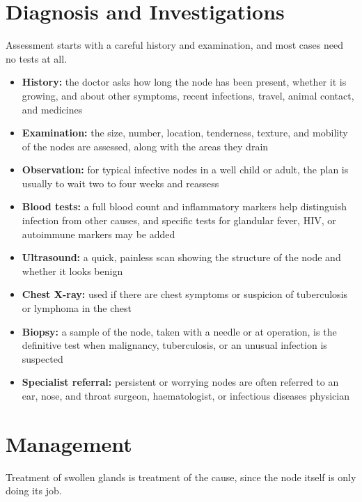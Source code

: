 \section*{Diagnosis and Investigations}
Assessment starts with a careful history and examination, and most cases need no tests at all.

\begin{itemize}
    \item \textbf{History:} the doctor asks how long the node has been present, whether it is growing, and about other symptoms, recent infections, travel, animal contact, and medicines
    \item \textbf{Examination:} the size, number, location, tenderness, texture, and mobility of the nodes are assessed, along with the areas they drain
    \item \textbf{Observation:} for typical infective nodes in a well child or adult, the plan is usually to wait two to four weeks and reassess
    \item \textbf{Blood tests:} a full blood count and inflammatory markers help distinguish infection from other causes, and specific tests for glandular fever, HIV, or autoimmune markers may be added
    \item \textbf{Ultrasound:} a quick, painless scan showing the structure of the node and whether it looks benign
    \item \textbf{Chest X-ray:} used if there are chest symptoms or suspicion of tuberculosis or lymphoma in the chest
    \item \textbf{Biopsy:} a sample of the node, taken with a needle or at operation, is the definitive test when malignancy, tuberculosis, or an unusual infection is suspected
    \item \textbf{Specialist referral:} persistent or worrying nodes are often referred to an ear, nose, and throat surgeon, haematologist, or infectious diseases physician
\end{itemize}

\section*{Management}
Treatment of swollen glands is treatment of the cause, since the node itself is only doing its job.

